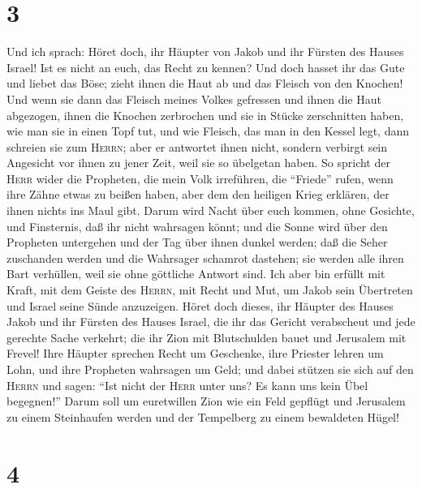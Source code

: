 \hypertarget{section-2}{%
\section{3}\label{section-2}}

 Und ich sprach: Höret doch, ihr Häupter von Jakob und ihr
Fürsten des Hauses Israel! Ist es nicht an euch, das Recht zu kennen?
 Und doch hasset ihr das Gute und liebet das Böse; zieht
ihnen die Haut ab und das Fleisch von den Knochen!  Und
wenn sie dann das Fleisch meines Volkes gefressen und ihnen die Haut
abgezogen, ihnen die Knochen zerbrochen und sie in Stücke zerschnitten
haben, wie man sie in einen Topf tut, und wie Fleisch, das man in den
Kessel legt,  dann schreien sie zum \textsc{Herrn}; aber
er antwortet ihnen nicht, sondern verbirgt sein Angesicht vor ihnen zu
jener Zeit, weil sie so übelgetan haben.  So spricht der
\textsc{Herr} wider die Propheten, die mein Volk irreführen, die
``Friede'' rufen, wenn ihre Zähne etwas zu beißen haben, aber dem den
heiligen Krieg erklären, der ihnen nichts ins Maul gibt. 
Darum wird Nacht über euch kommen, ohne Gesichte, und Finsternis, daß
ihr nicht wahrsagen könnt; und die Sonne wird über den Propheten
untergehen und der Tag über ihnen dunkel werden;  daß die
Seher zuschanden werden und die Wahrsager schamrot dastehen; sie werden
alle ihren Bart verhüllen, weil sie ohne göttliche Antwort sind.
 Ich aber bin erfüllt mit Kraft, mit dem Geiste des
\textsc{Herrn}, mit Recht und Mut, um Jakob sein Übertreten und Israel
seine Sünde anzuzeigen.  Höret doch dieses, ihr Häupter
des Hauses Jakob und ihr Fürsten des Hauses Israel, die ihr das Gericht
verabscheut und jede gerechte Sache verkehrt;  die ihr
Zion mit Blutschulden bauet und Jerusalem mit Frevel! 
Ihre Häupter sprechen Recht um Geschenke, ihre Priester lehren um Lohn,
und ihre Propheten wahrsagen um Geld; und dabei stützen sie sich auf den
\textsc{Herrn} und sagen: ``Ist nicht der \textsc{Herr} unter uns? Es
kann uns kein Übel begegnen!''  Darum soll um euretwillen
Zion wie ein Feld gepflügt und Jerusalem zu einem Steinhaufen werden und
der Tempelberg zu einem bewaldeten Hügel!

\hypertarget{section-3}{%
\section{4}\label{section-3}}

